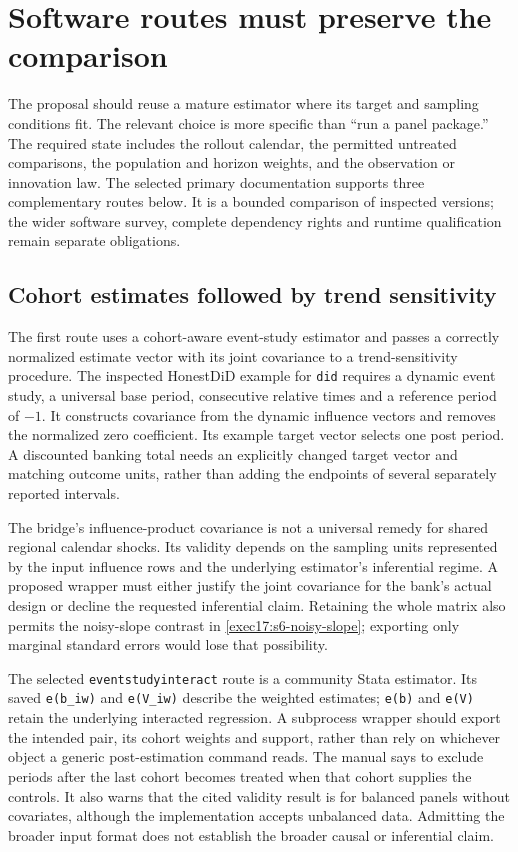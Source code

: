 \section{Software routes must preserve the comparison}
\label{exec17:s6-software}

The proposal should reuse a mature estimator where its target and
sampling conditions fit. The relevant choice is more specific than
``run a panel package.'' The required state includes the rollout
calendar, the permitted untreated comparisons, the population and
horizon weights, and the observation or innovation law. The selected
primary documentation supports three complementary routes below.
It is a bounded comparison of inspected versions; the wider software
survey, complete dependency rights and runtime qualification remain
separate obligations.\citep{exec17_s6_paths}

\subsection{Cohort estimates followed by trend sensitivity}

The first route uses a cohort-aware event-study estimator and passes
a correctly normalized estimate vector with its joint covariance to
a trend-sensitivity procedure. The inspected HonestDiD example for
\texttt{did} requires a dynamic event study, a universal base period,
consecutive relative times and a reference period of $-1$. It
constructs covariance from the dynamic influence vectors and removes
the normalized zero coefficient. Its example target vector selects
one post period. A discounted banking total needs an explicitly
changed target vector and matching outcome units, rather than adding
the endpoints of several separately reported intervals.
\citep{sw_honestdid,exec17_s6_paths}

The bridge's influence-product covariance is not a universal remedy
for shared regional calendar shocks. Its validity depends on the
sampling units represented by the input influence rows and the
underlying estimator's inferential regime. A proposed wrapper must
either justify the joint covariance for the bank's actual design or
decline the requested inferential claim. Retaining the whole matrix
also permits the noisy-slope contrast in
\eqref{exec17:s6-noisy-slope}; exporting only marginal standard
errors would lose that possibility.

The selected \texttt{eventstudyinteract} route is a community Stata
estimator. Its saved \texttt{e(b\_iw)} and \texttt{e(V\_iw)} describe
the weighted estimates; \texttt{e(b)} and \texttt{e(V)} retain the
underlying interacted regression. A subprocess wrapper should export
the intended pair, its cohort weights and support, rather than rely
on whichever object a generic post-estimation command reads. The
manual says to exclude periods after the last cohort becomes treated
when that cohort supplies the controls. It also warns that the cited
validity result is for balanced panels without covariates, although
the implementation accepts unbalanced data. Admitting the broader
input format does not establish the broader causal or inferential
claim.\citep{v12_sw_eventstudyinteract}

